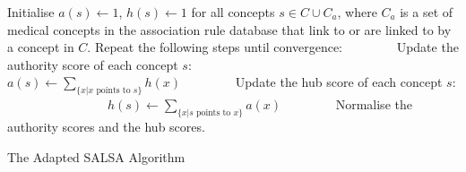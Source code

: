 \documentclass[1p]{elsarticle}
\begin{document}
\begin{algorithm}[tb]
\begin{algorithmic}[1]
\STATE Initialise $a(s) \leftarrow 1$, $h(s) \leftarrow 1$ for all concepts $s \in C \cup C_a$, where $C_a$ is a set of medical concepts in the association rule database that link to or are linked to by a concept in $C$.
\STATE Repeat the following steps until convergence:
\STATE ~~~~~~~~Update the authority score of each concept $s$:
\STATE ~~~~~~~~~~~~~~~~$a(s) \leftarrow \sum_{\{ x | x \textrm{ points to } s\}} h(x)$
\STATE ~~~~~~~~Update the hub score of each concept $s$:
\STATE ~~~~~~~~~~~~~~~~$h(s) \leftarrow \sum_{\{ x | s \textrm{ points to } x\}} a(x)$
\STATE ~~~~~~~~Normalise the authority scores and the hub scores.
\end{algorithmic}
\caption{The Adapted SALSA Algorithm}
\label{al:c7:salsa}
\end{algorithm}
\end{document}
